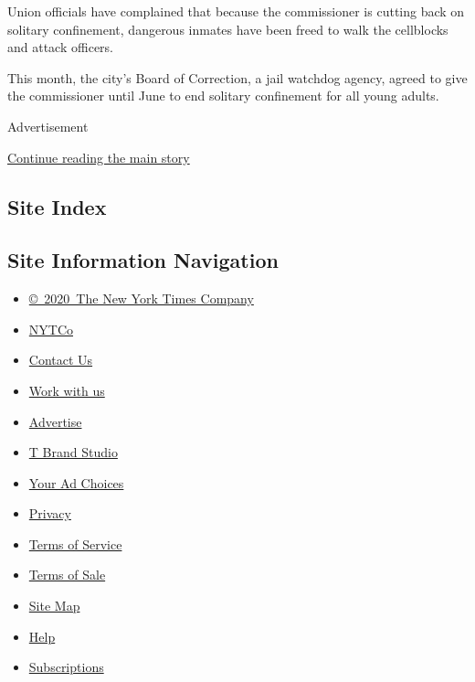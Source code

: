 Union officials have complained that because the commissioner is cutting
back on solitary confinement, dangerous inmates have been freed to walk
the cellblocks and attack officers.

This month, the city's Board of Correction, a jail watchdog agency,
agreed to give the commissioner until June to end solitary confinement
for all young adults.

Advertisement

\protect\hyperlink{after-bottom}{Continue reading the main story}

\hypertarget{site-index}{%
\subsection{Site Index}\label{site-index}}

\hypertarget{site-information-navigation}{%
\subsection{Site Information
Navigation}\label{site-information-navigation}}

\begin{itemize}
\tightlist
\item
  \href{https://help.nytimes3xbfgragh.onion/hc/en-us/articles/115014792127-Copyright-notice}{©~2020~The
  New York Times Company}
\end{itemize}

\begin{itemize}
\tightlist
\item
  \href{https://www.nytco.com/}{NYTCo}
\item
  \href{https://help.nytimes3xbfgragh.onion/hc/en-us/articles/115015385887-Contact-Us}{Contact
  Us}
\item
  \href{https://www.nytco.com/careers/}{Work with us}
\item
  \href{https://nytmediakit.com/}{Advertise}
\item
  \href{http://www.tbrandstudio.com/}{T Brand Studio}
\item
  \href{https://www.nytimes3xbfgragh.onion/privacy/cookie-policy\#how-do-i-manage-trackers}{Your
  Ad Choices}
\item
  \href{https://www.nytimes3xbfgragh.onion/privacy}{Privacy}
\item
  \href{https://help.nytimes3xbfgragh.onion/hc/en-us/articles/115014893428-Terms-of-service}{Terms
  of Service}
\item
  \href{https://help.nytimes3xbfgragh.onion/hc/en-us/articles/115014893968-Terms-of-sale}{Terms
  of Sale}
\item
  \href{https://spiderbites.nytimes3xbfgragh.onion}{Site Map}
\item
  \href{https://help.nytimes3xbfgragh.onion/hc/en-us}{Help}
\item
  \href{https://www.nytimes3xbfgragh.onion/subscription?campaignId=37WXW}{Subscriptions}
\end{itemize}
